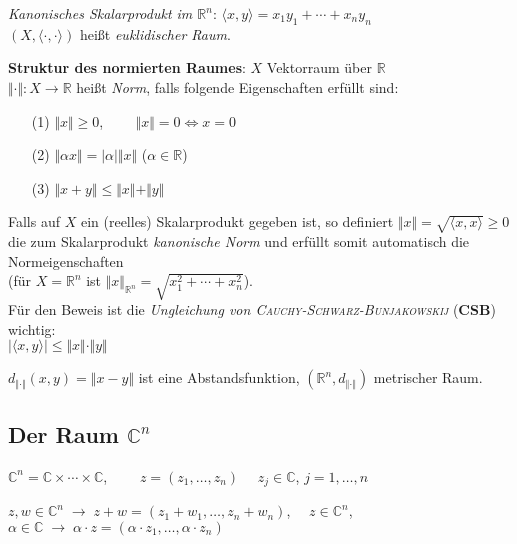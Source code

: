 \emph{Kanonisches Skalarprodukt im $\mathbb{R}^n$}:
$\langle x, y \rangle = x_1 y_1 + \cdots + x_n y_n$ \\
$(X, \langle \cdot, \cdot \rangle)$ heißt \emph{euklidischer Raum}.

\linie

\textbf{Struktur des normierten Raumes}:
$X$ Vektorraum über $\mathbb{R}$ \\
$\Vert \cdot \Vert: X \rightarrow \mathbb{R}$ heißt \emph{Norm}, falls
folgende Eigenschaften erfüllt sind:

\begin{itemize}
    \item[(1)] $\Vert x \Vert \ge 0$,
    $\qquad \Vert x \Vert = 0 \Leftrightarrow x = 0$

    \item[(2)] $\Vert \alpha x \Vert = |\alpha| \Vert x \Vert$
    \qquad ($\alpha \in \mathbb{R}$)

    \item[(3)] $\Vert x + y \Vert \le \Vert x \Vert + \Vert y \Vert$
\end{itemize}

Falls auf $X$ ein (reelles) Skalarprodukt gegeben ist, so definiert
$\Vert x \Vert = \sqrt{\langle x, x \rangle} \ge 0$ die zum Skalarprodukt
\emph{kanonische Norm} und erfüllt somit automatisch die Normeigenschaften \\
(für $X = \mathbb{R}^n$ ist $\Vert x \Vert_{\mathbb{R}^n} =
\sqrt{x_1^2 + \cdots + x_n^2}$). \\
Für den Beweis ist die \emph{Ungleichung von
\textsc{Cauchy}-\textsc{Schwarz}-\textsc{Bunjakowskij}} (\textbf{CSB})
wichtig: \\
$|\langle x, y \rangle| \le \Vert x \Vert \cdot \Vert y \Vert$

$d_{\Vert \cdot \Vert}(x,y) = \Vert x - y \Vert$ ist eine Abstandsfunktion,
$(\mathbb{R}^n, d_{\Vert \cdot \Vert})$ metrischer Raum.

\subsection{%
    \texorpdfstring{Der Raum $\mathbb{C}^n$}{Der Raum ℂⁿ}%
}

$\mathbb{C}^n = \mathbb{C} \times \cdots \times \mathbb{C}$,
$\qquad z = (z_1, \ldots, z_n) \quad$ $z_j \in \mathbb{C}$,
$j = 1, \ldots, n$

$z, w \in \mathbb{C}^n \;\rightarrow\; z + w = (z_1 + w_1, \ldots, z_n + w_n)$,
$\quad z \in \mathbb{C}^n$, $\alpha \in \mathbb{C} \;\rightarrow\;
\alpha \cdot z = (\alpha \cdot z_1, \ldots, \alpha \cdot z_n)$

